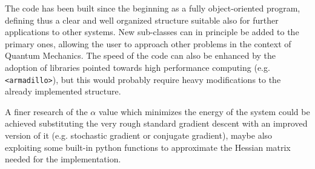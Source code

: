The code has been built since the beginning as a fully object-oriented program, defining thus a clear and well organized structure suitable also for further applications to other systems. New sub-classes can in principle be added to the primary ones, allowing the user to approach other problems in the context of Quantum Mechanics. The speed of the code can also be enhanced by the adoption of libraries pointed towards high performance computing (e.g. \texttt{<armadillo>}), but this would probably require heavy modifications to the already implemented structure.

A finer research of the $\alpha$ value which minimizes the energy of the system could be achieved substituting the very rough standard gradient descent with an improved version of it (e.g. stochastic gradient or conjugate gradient), maybe also exploiting some built-in python functions to approximate the Hessian matrix needed for the implementation. 
